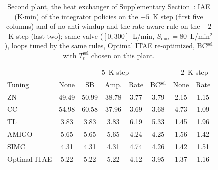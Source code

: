 \begin{table}[t]
\centering
\footnotesize
\setlength{\tabcolsep}{3pt}
\caption{Second plant, the heat exchanger of Supplementary Section~: IAE (K$\cdot$min) of the integrator policies on the $-5$~K step (first five columns) and of no anti-windup and the rate-aware rule on the $-2$~K step (last two); same valve ($[0, 300]$~L/min, $S_{\max} = 80$~L/min$^2$), loops tuned by the same rules, Optimal ITAE re-optimized, BC$^{\mathrm{sel}}$ with $T_t^{\mathrm{sel}}$ chosen on this plant.}
\label{tab:hx}
\begin{tabular}{lccccccc}
\toprule
 & \multicolumn{5}{c}{$-5$~K step} & \multicolumn{2}{c}{$-2$~K step} \\
Tuning & None & SB & Amp. & Rate & BC$^{\mathrm{sel}}$ & None & Rate \\
\midrule
ZN & 49.49 & 50.99 & 38.78 & 3.77 & 3.79 & 2.15 & 1.15 \\
CC & 54.98 & 60.58 & 37.96 & 3.69 & 3.68 & 4.73 & 1.09 \\
TL & 3.83 & 3.83 & 3.83 & 6.19 & 5.33 & 1.45 & 1.96 \\
AMIGO & 5.65 & 5.65 & 5.65 & 4.24 & 4.25 & 1.56 & 1.42 \\
SIMC & 4.31 & 4.31 & 4.31 & 4.74 & 4.26 & 1.42 & 1.51 \\
Optimal ITAE & 5.22 & 5.22 & 5.22 & 4.12 & 3.95 & 1.37 & 1.16 \\
\bottomrule
\end{tabular}
\end{table}
